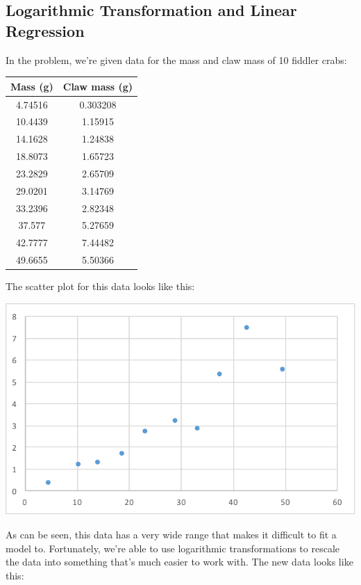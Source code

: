\documentclass[10pt,letterpaper]{article}
\begin{document}
		\subsection{Logarithmic Transformation and Linear Regression}
			In the problem, we're given data for the mass and claw mass of 10 fiddler crabs:
			\begin{center}
				\begin{tabular}{c c}
					Mass (g) & Claw mass (g)\\
					\hline
					4.74516 & 0.303208 \\
					10.4439 & 1.15915 \\
					14.1628 & 1.24838 \\
					18.8073 & 1.65723 \\
					23.2829 & 2.65709 \\
					29.0201 & 3.14769 \\
					33.2396 & 2.82348 \\
					37.577  & 5.27659 \\
					42.7777 & 7.44482 \\
					49.6655 & 5.50366
				\end{tabular}
			\end{center}
			The scatter plot for this data looks like this:
			\newline \newline
			\centerline{\includegraphics{Picture1.pdf}}
			\newline \newline
			As can be seen, this data has a very wide range that makes it difficult to fit a model to. Fortunately, we're able to use logarithmic transformations to rescale the data into something that's much easier to work with. The new data looks like this:
\end{document}
